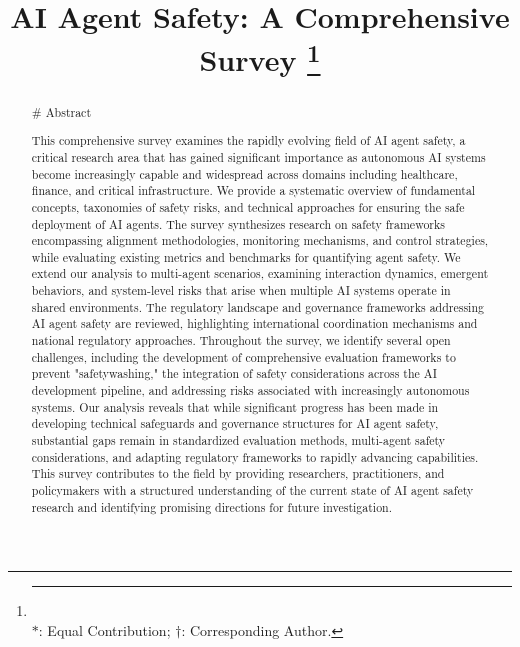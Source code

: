 \documentclass[conference]{IEEEtran}
\begin{document}
\title{AI Agent Safety: A Comprehensive Survey
%
\thanks{\hspace*{-\parindent}\rule{3.8cm}{0.4pt} \\
$\ast$: Equal Contribution;  $\dagger$: Corresponding Author.}
}

\author{
\and
{}
}

\maketitle

\begin{abstract}
# Abstract

This comprehensive survey examines the rapidly evolving field of AI agent safety, a critical research area that has gained significant importance as autonomous AI systems become increasingly capable and widespread across domains including healthcare, finance, and critical infrastructure. We provide a systematic overview of fundamental concepts, taxonomies of safety risks, and technical approaches for ensuring the safe deployment of AI agents. The survey synthesizes research on safety frameworks encompassing alignment methodologies, monitoring mechanisms, and control strategies, while evaluating existing metrics and benchmarks for quantifying agent safety. We extend our analysis to multi-agent scenarios, examining interaction dynamics, emergent behaviors, and system-level risks that arise when multiple AI systems operate in shared environments. The regulatory landscape and governance frameworks addressing AI agent safety are reviewed, highlighting international coordination mechanisms and national regulatory approaches. Throughout the survey, we identify several open challenges, including the development of comprehensive evaluation frameworks to prevent "safetywashing," the integration of safety considerations across the AI development pipeline, and addressing risks associated with increasingly autonomous systems. Our analysis reveals that while significant progress has been made in developing technical safeguards and governance structures for AI agent safety, substantial gaps remain in standardized evaluation methods, multi-agent safety considerations, and adapting regulatory frameworks to rapidly advancing capabilities. This survey contributes to the field by providing researchers, practitioners, and policymakers with a structured understanding of the current state of AI agent safety research and identifying promising directions for future investigation.
\end{abstract}
\end{document}
